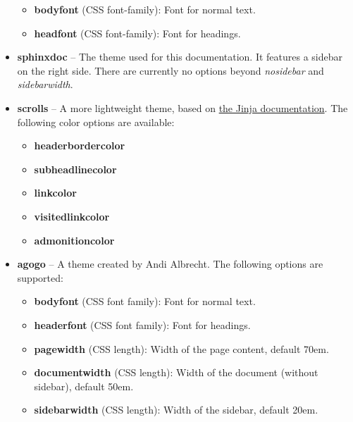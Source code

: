 \documentclass[letterpaper,10pt,english]{sphinxmanual}
\begin{document}
\begin{itemize}
\begin{itemize}
\item {} 
\textbf{bodyfont} (CSS font-family): Font for normal text.

\item {} 
\textbf{headfont} (CSS font-family): Font for headings.

\end{itemize}

\item {} 
\textbf{sphinxdoc} -- The theme used for this documentation.  It features a sidebar
on the right side.  There are currently no options beyond \emph{nosidebar} and
\emph{sidebarwidth}.

\item {} 
\textbf{scrolls} -- A more lightweight theme, based on \href{http://jinja.pocoo.org/}{the Jinja documentation}.  The following color options are available:
\begin{itemize}
\item {} 
\textbf{headerbordercolor}

\item {} 
\textbf{subheadlinecolor}

\item {} 
\textbf{linkcolor}

\item {} 
\textbf{visitedlinkcolor}

\item {} 
\textbf{admonitioncolor}

\end{itemize}

\item {} 
\textbf{agogo} -- A theme created by Andi Albrecht.  The following options are
supported:
\begin{itemize}
\item {} 
\textbf{bodyfont} (CSS font family): Font for normal text.

\item {} 
\textbf{headerfont} (CSS font family): Font for headings.

\item {} 
\textbf{pagewidth} (CSS length): Width of the page content, default 70em.

\item {} 
\textbf{documentwidth} (CSS length): Width of the document (without sidebar),
default 50em.

\item {} 
\textbf{sidebarwidth} (CSS length): Width of the sidebar, default 20em.


\end{itemize}
\end{itemize}
\end{document}

